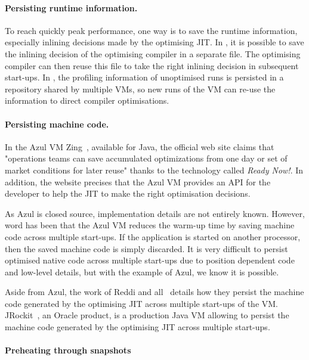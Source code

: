 \documentclass[a4paper,12pt,twoside]{../includes/ThesisStyle}
\begin{document}
\paragraph{Persisting runtime information.}

To reach quickly peak performance, one way is to save the runtime information, especially inlining decisions made by the optimising JIT. In 
 \cite{Sun06}, it is possible to save the inlining decision of the optimising compiler in a separate file. The optimising compiler can then reuse this file to take the right inlining decision in subsequent start-ups. In \cite{Arno05c}, the profiling information of unoptimised runs is persisted in a repository shared by multiple VMs, so new runs of the VM can re-use the information to direct compiler optimisations.

\paragraph{Persisting machine code.}

In the Azul VM Zing~\cite{Azul}, available for Java, the official web site claims that "operations teams can save accumulated optimizations from one day or set of market conditions for later reuse" thanks to the technology called \emph{Ready Now!}. In addition, the website precises that the Azul VM provides an API for the developer to help the JIT to make the right optimisation decisions. 

As Azul is closed source, implementation details are not entirely known. However, word has been that the Azul VM reduces the warm-up time by saving machine code across multiple start-ups. If the application is started on another processor, then the saved machine code is simply discarded. It is very difficult to persist optimised native code across multiple start-ups due to position dependent code and low-level details, but with the example of Azul, we know it is possible.

Aside from Azul, the work of Reddi and all~\cite{Redd07a} details how they persist the machine code generated by the optimising JIT across multiple start-ups of the VM. JRockit~\cite{JRockit}, an Oracle product, is a production Java VM allowing to persist the machine code generated by the optimising JIT across multiple start-ups.

\paragraph{Preheating through snapshots}
\end{document}
